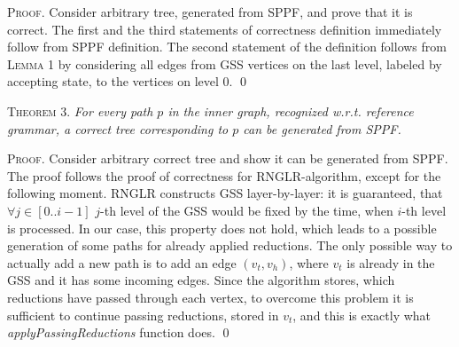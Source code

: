 \textsc{Proof.} Consider arbitrary tree, generated from SPPF, and prove that it is correct. The first and the third statements
of correctness definition immediately follow from SPPF definition. The second statement of the definition follows from \textsc{Lemma 1} 
by considering all edges from GSS vertices on the last level, labeled by accepting state, to the vertices on level 0.
\qed

\textsc{Theorem 3.} 
\textit{For every path $p$ in the inner graph, recognized w.r.t. reference grammar, a correct tree corresponding to $p$ can 
be generated from SPPF.}

\textsc{Proof.}
Consider arbitrary correct tree and show it can be generated from SPPF. The proof follows the proof of correctness 
for RNGLR-algorithm, except for the following moment. RNGLR constructs GSS layer-by-layer: it is guaranteed, that $\forall j \in [0..i-1]$ 
$j$-th level of the GSS would be fixed by the time, when $i$-th level is processed. In our case, 
this property does not hold, which leads to a possible generation of some paths for already applied reductions. 
The only possible way to actually add a new path is to add an edge $(v_{t}, v_{h})$, where $v_{t}$ is already in the GSS and 
it has some incoming edges. Since the algorithm stores, which reductions have passed through each vertex, to overcome this problem 
it is sufficient to continue passing reductions, stored in $v_{t}$, and this is exactly what \emph{applyPassingReductions} 
function does. 
\qed
